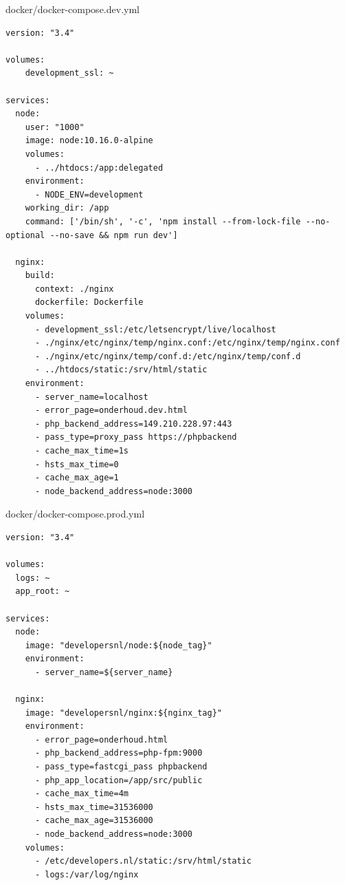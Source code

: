 docker/docker-compose.dev.yml
\begin{verbatim}
version: "3.4"

volumes:
    development_ssl: ~

services:
  node:
    user: "1000"
    image: node:10.16.0-alpine
    volumes:
      - ../htdocs:/app:delegated
    environment:
      - NODE_ENV=development
    working_dir: /app
    command: ['/bin/sh', '-c', 'npm install --from-lock-file --no-optional --no-save && npm run dev']

  nginx:
    build:
      context: ./nginx 
      dockerfile: Dockerfile
    volumes:
      - development_ssl:/etc/letsencrypt/live/localhost
      - ./nginx/etc/nginx/temp/nginx.conf:/etc/nginx/temp/nginx.conf
      - ./nginx/etc/nginx/temp/conf.d:/etc/nginx/temp/conf.d
      - ../htdocs/static:/srv/html/static
    environment:
      - server_name=localhost
      - error_page=onderhoud.dev.html
      - php_backend_address=149.210.228.97:443
      - pass_type=proxy_pass https://phpbackend
      - cache_max_time=1s
      - hsts_max_time=0
      - cache_max_age=1
      - node_backend_address=node:3000
\end{verbatim}

docker/docker-compose.prod.yml
\begin{verbatim}
version: "3.4"

volumes:
  logs: ~
  app_root: ~

services:
  node:
    image: "developersnl/node:${node_tag}"
    environment:
      - server_name=${server_name}

  nginx:
    image: "developersnl/nginx:${nginx_tag}"
    environment:
      - error_page=onderhoud.html
      - php_backend_address=php-fpm:9000
      - pass_type=fastcgi_pass phpbackend
      - php_app_location=/app/src/public
      - cache_max_time=4m
      - hsts_max_time=31536000
      - cache_max_age=31536000
      - node_backend_address=node:3000
    volumes:
      - /etc/developers.nl/static:/srv/html/static
      - logs:/var/log/nginx
\end{verbatim}

